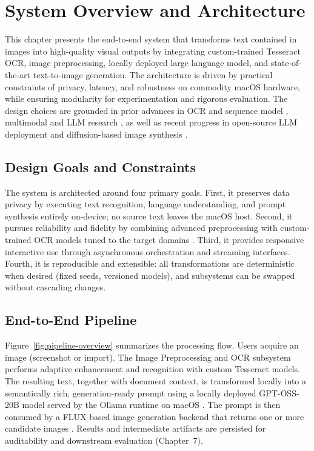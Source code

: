 \chapter{System Overview and Architecture}

This chapter presents the end-to-end system that transforms text contained in images into high-quality visual outputs by integrating custom-trained Tesseract OCR, image preprocessing, locally deployed large language model, and state-of-the-art text-to-image generation. The architecture is driven by practical constraints of privacy, latency, and robustness on commodity macOS hardware, while ensuring modularity for experimentation and rigorous evaluation. The design choices are grounded in prior advances in OCR and sequence model \cite{smith2007overview, graves2006connectionist, hochreiter1997long}, multimodal and LLM research \cite{qin2024comprehensive, jin2024mm}, as well as recent progress in open-source LLM deployment \cite{openai2025gptoss} and diffusion-based image synthesis \cite{blackforestlabs2024flux, rombach2025flux}.

\section{Design Goals and Constraints}

The system is architected around four primary goals. First, it preserves data privacy by executing text recognition, language understanding, and prompt synthesis entirely on-device; no source text leaves the macOS host. Second, it pursues reliability and fidelity by combining advanced preprocessing with custom-trained OCR models tuned to the target domains \cite{esser2020improving}. Third, it provides responsive interactive use through asynchronous orchestration and streaming interfaces. Fourth, it is reproducible and extensible: all transformations are deterministic when desired (fixed seeds, versioned models), and subsystems can be swapped without cascading changes.

\section{End-to-End Pipeline}

Figure~\ref{fig:pipeline-overview} summarizes the processing flow. Users acquire an image (screenshot or import). The Image Preprocessing and OCR subsystem performs adaptive enhancement and recognition with custom Tesseract models. The resulting text, together with document context, is transformed locally into a semantically rich, generation-ready prompt using a locally deployed GPT-OSS-20B model served by the Ollama runtime on macOS \cite{openai2025gptoss}. The prompt is then consumed by a FLUX-based image generation backend that returns one or more candidate images \cite{blackforestlabs2024flux, rombach2025flux}. Results and intermediate artifacts are persisted for auditability and downstream evaluation (Chapter~7).

